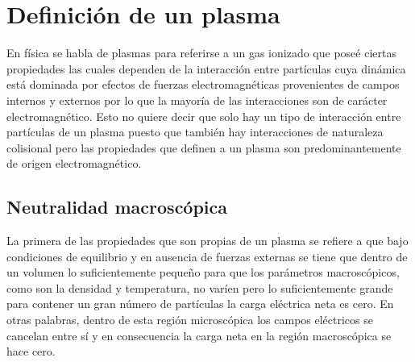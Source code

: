 \documentclass[../tesis_main_file.tex]{subfiles}
\begin{document}
\section{Definición de un plasma}
En física se habla de plasmas para referirse a un gas ionizado que poseé ciertas propiedades las cuales dependen de la interacción entre partículas cuya dinámica está dominada por efectos de fuerzas electromagnéticas provenientes de campos internos y externos por lo que la mayoría de las interacciones son de carácter electromagnético.
Esto no quiere decir que solo hay un tipo de interacción entre partículas de un plasma puesto que también hay interacciones de naturaleza colisional pero las propiedades que definen a un plasma son predominantemente de origen electromagnético. 
\subsection{Neutralidad macroscópica}
La primera de las propiedades que son propias de un plasma se refiere a que bajo condiciones de equilibrio y en ausencia de fuerzas externas se tiene que dentro de un volumen lo suficientemente pequeño para que los parámetros macroscópicos, como son la densidad y temperatura, no varíen pero lo suficientemente grande para contener un gran número de partículas la carga eléctrica neta es cero.
En otras palabras, dentro de esta región microscópica los campos eléctricos se cancelan entre sí y en consecuencia la carga neta en la región macroscópica se hace cero.  
\end{document}
